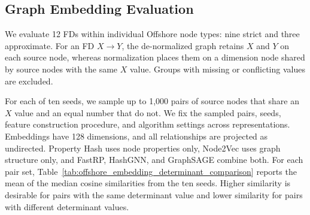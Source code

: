 \documentclass[sigconf]{acmart}
\begin{document}
\subsection{Graph Embedding Evaluation}

We evaluate 12 FDs within individual Offshore node types: nine strict and three
approximate. For an FD $X\rightarrow Y$, the de-normalized graph retains $X$
and $Y$ on each source node, whereas normalization places them on a dimension
node shared by source nodes with the same $X$ value. Groups with missing or
conflicting values are excluded.

For each of ten seeds, we sample up to 1,000 pairs of source nodes that share
an $X$ value and an equal number that do not. We fix the sampled pairs, seeds,
feature construction procedure, and algorithm settings across representations.
Embeddings have 128 dimensions, and all relationships are projected as
undirected. Property Hash uses node properties only, Node2Vec uses graph
structure only, and FastRP, HashGNN, and GraphSAGE combine both. For each pair
set, Table~\ref{tab:offshore_embedding_determinant_comparison} reports the mean
of the median cosine similarities from the ten seeds. Higher similarity is
desirable for pairs with the same determinant value and lower similarity for
pairs with different determinant values.
\end{document}
